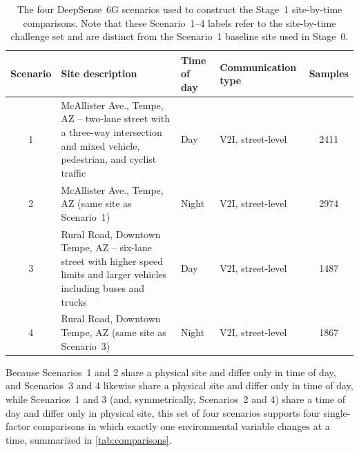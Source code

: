 \documentclass{iutbscthesis}
\begin{document}
\begin{table}[H]
    \centering
    \begin{tabular}{c p{} p{} p{} c}
        \toprule
        Scenario & Site description & Time of day & Communication type & Samples \\
        \midrule
        1 & McAllister Ave., Tempe, AZ -- two-lane street with a three-way intersection and mixed vehicle, pedestrian, and cyclist traffic & Day & V2I, street-level & 2411 \\
        2 & McAllister Ave., Tempe, AZ (same site as Scenario~1) & Night & V2I, street-level & 2974 \\
        3 & Rural Road, Downtown Tempe, AZ -- six-lane street with higher speed limits and larger vehicles including buses and trucks & Day & V2I, street-level & 1487 \\
        4 & Rural Road, Downtown Tempe, AZ (same site as Scenario~3) & Night & V2I, street-level & 1867 \\
        \bottomrule
    \end{tabular}
    \caption{The four DeepSense~6G scenarios used to construct the Stage~1 site-by-time comparisons. Note that these Scenario~1--4 labels refer to the site-by-time challenge set and are distinct from the Scenario~1 baseline site used in Stage~0.}
    \label{tab:scenarios}
\end{table}

Because Scenarios~1 and 2 share a physical site and differ only in time of day, and Scenarios~3 and 4 likewise share a physical site and differ only in time of day, while Scenarios~1 and 3 (and, symmetrically, Scenarios~2 and 4) share a time of day and differ only in physical site, this set of four scenarios supports four single-factor comparisons in which exactly one environmental variable changes at a time, summarized in \autoref{tab:comparisons}.
\end{document}
